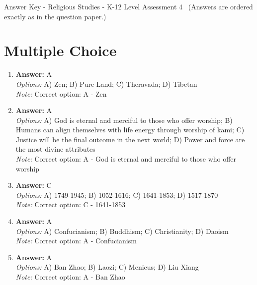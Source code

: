 \documentclass[12pt]{article}
\begin{document}
\begin{center}
Answer Key - Religious Studies - K-12 Level Assessment 4 \
\small (Answers are ordered exactly as in the question paper.)
\end{center}

\section*{Multiple Choice}
\begin{enumerate}[label=\arabic*.]
\item \textbf{Answer:} A
\\ \textit{Options:} A) Zen; B) Pure Land; C) Theravada; D) Tibetan
\\ \textit{Note:} Correct option: A - Zen
\item \textbf{Answer:} A
\\ \textit{Options:} A) God is eternal and merciful to those who offer worship; B) Humans can align themselves with life energy through worship of kami; C) Justice will be the final outcome in the next world; D) Power and force are the most divine attributes
\\ \textit{Note:} Correct option: A - God is eternal and merciful to those who offer worship
\item \textbf{Answer:} C
\\ \textit{Options:} A) 1749-1945; B) 1052-1616; C) 1641-1853; D) 1517-1870
\\ \textit{Note:} Correct option: C - 1641-1853
\item \textbf{Answer:} A
\\ \textit{Options:} A) Confucianism; B) Buddhism; C) Christianity; D) Daoism
\\ \textit{Note:} Correct option: A - Confucianism
\item \textbf{Answer:} A
\\ \textit{Options:} A) Ban Zhao; B) Laozi; C) Menicus; D) Liu Xiang
\\ \textit{Note:} Correct option: A - Ban Zhao
\end{enumerate}
\end{document}
